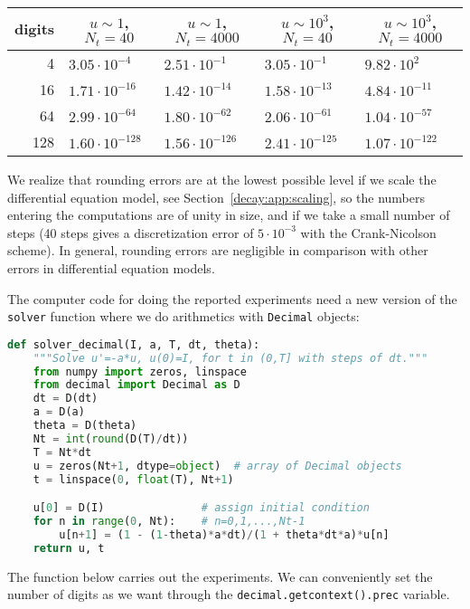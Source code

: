 \documentclass[graybox,sectrefs,envcountresetchap,open=right,final]{svmonodo}
\begin{document}
{\small   %

\vspace{4mm}

\begin{tabular}{rllll}
\hline
\multicolumn{1}{c}{ digits } & \multicolumn{1}{c}{ $u\sim 1$, $N_t=40$ } & \multicolumn{1}{c}{ $u\sim 1$, $N_t=4000$ } & \multicolumn{1}{c}{ $u\sim 10^3$, $N_t=40$ } & \multicolumn{1}{c}{ $u\sim 10^3$, $N_t=4000$ } \\
\hline
4      & $3.05\cdot 10^{-4}$   & $2.51\cdot 10^{-1}$   & $3.05\cdot 10^{-1}$    & $9.82\cdot 10^{2}$       \\
16     & $1.71\cdot 10^{-16}$  & $1.42\cdot 10^{-14}$  & $1.58\cdot 10^{-13}$   & $4.84\cdot 10^{-11}$     \\
64     & $2.99\cdot 10^{-64}$  & $1.80\cdot 10^{-62}$  & $2.06\cdot 10^{-61}$   & $1.04\cdot 10^{-57}$     \\
128    & $1.60\cdot 10^{-128}$ & $1.56\cdot 10^{-126}$ & $2.41\cdot 10^{-125}$  & $1.07\cdot 10^{-122}$    \\
\hline
\end{tabular}

\vspace{4mm}

}


\noindent
We realize that rounding errors are at the lowest possible level
if we scale the differential equation model,
see Section~\ref{decay:app:scaling},
so the numbers entering the computations are of unity in size,
and if we take a small number of steps (40 steps gives a discretization error
of $5\cdot 10^{-3}$ with the Crank-Nicolson scheme).
In general, rounding errors are negligible in comparison with other errors
in differential equation models.

The computer code for doing the reported experiments need a new version
of the \texttt{solver} function where we do arithmetics with \texttt{Decimal}
objects:

\begin{lstlisting}[language=Python,style=blue1_bluegreen]
def solver_decimal(I, a, T, dt, theta):
    """Solve u'=-a*u, u(0)=I, for t in (0,T] with steps of dt."""
    from numpy import zeros, linspace
    from decimal import Decimal as D
    dt = D(dt)
    a = D(a)
    theta = D(theta)
    Nt = int(round(D(T)/dt))
    T = Nt*dt
    u = zeros(Nt+1, dtype=object)  # array of Decimal objects
    t = linspace(0, float(T), Nt+1)

    u[0] = D(I)               # assign initial condition
    for n in range(0, Nt):    # n=0,1,...,Nt-1
        u[n+1] = (1 - (1-theta)*a*dt)/(1 + theta*dt*a)*u[n]
    return u, t
\end{lstlisting}
The function below carries out the experiments. We can conveniently
set the number of digits as we want through the \texttt{decimal.getcontext().prec}
variable.
\end{document}
